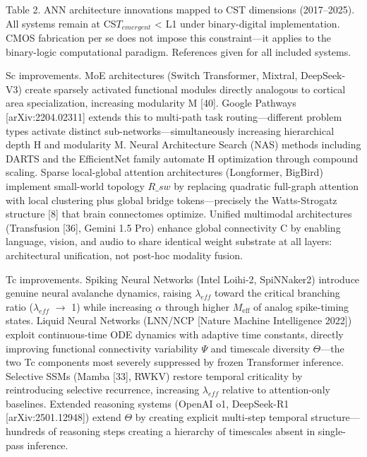 \documentclass[a4paper,12pt]{article}
\begin{document}
Table 2. ANN architecture innovations mapped to CST dimensions (2017--2025). All systems remain at CS$T_{emergent}$ < L1 under binary-digital implementation. CMOS fabrication per se does not impose this constraint---it applies to the binary-logic computational paradigm. References given for all included systems.


Sc improvements.
MoE architectures (Switch Transformer, Mixtral, DeepSeek-V3) create sparsely activated functional modules directly analogous to cortical area specialization, increasing modularity M [40].
Google Pathways [arXiv:2204.02311] extends this to multi-path task routing---different problem types activate distinct sub-networks---simultaneously increasing hierarchical depth H and modularity M.
Neural Architecture Search (NAS) methods including DARTS and the EfficientNet family automate H optimization through compound scaling.
Sparse local-global attention architectures (Longformer, BigBird) implement small-world topology $R\_{sw}$ by replacing quadratic full-graph attention with local clustering plus global bridge tokens---precisely the Watts-Strogatz structure [8] that brain connectomes optimize.
Unified multimodal architectures (Transfusion [36], Gemini 1.5 Pro) enhance global connectivity C by enabling language, vision, and audio to share identical weight substrate at all layers: architectural unification, not post-hoc modality fusion.


Tc improvements.
Spiking Neural Networks (Intel Loihi-2, SpiNNaker2) introduce genuine neural avalanche dynamics, raising $\lambda_{eff}$ toward the critical branching ratio ($\lambda_{eff}$ $\rightarrow$ 1) while increasing $\alpha$ through higher $M_{\text{eff}}$ of analog spike-timing states.
Liquid Neural Networks (LNN/NCP [Nature Machine Intelligence 2022]) exploit continuous-time ODE dynamics with adaptive time constants, directly improving functional connectivity variability $\Psi$ and timescale diversity $\Theta$---the two Tc components most severely suppressed by frozen Transformer inference.
Selective SSMs (Mamba [33], RWKV) restore temporal criticality by reintroducing selective recurrence, increasing $\lambda_{eff}$ relative to attention-only baselines.
Extended reasoning systems (OpenAI o1, DeepSeek-R1 [arXiv:2501.12948]) extend $\Theta$ by creating explicit multi-step temporal structure---hundreds of reasoning steps creating a hierarchy of timescales absent in single-pass inference.
\end{document}
